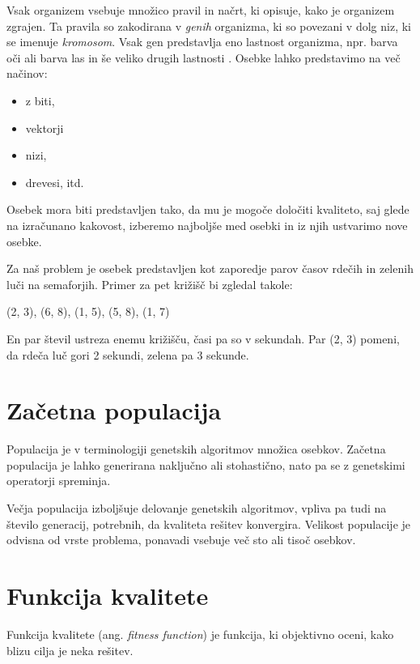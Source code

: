 \documentclass[a4paper, 12pt]{book}
\begin{document}
Vsak organizem vsebuje mno\v zico pravil in na\v crt, ki opisuje, kako je organizem zgrajen. Ta pravila so zakodirana v \textit{genih} organizma, ki so povezani v dolg niz, ki se imenuje \textit{kromosom}. Vsak gen predstavlja eno lastnost organizma, npr. barva o\v ci ali barva las in \v se veliko drugih lastnosti
\cite{aijunkie}. Osebke lahko predstavimo na ve\v c na\v cinov:

\begin{itemize} \itemsep0em
\item z biti,
\item vektorji
\item nizi,
\item drevesi, itd.
\end{itemize}

Osebek mora biti predstavljen tako, da mu je mogo\v ce dolo\v citi kvaliteto, saj glede na izra\v cunano kakovost, izberemo najbolj\v se med osebki in iz njih ustvarimo nove osebke.

Za na\v s problem je osebek predstavljen kot zaporedje parov \v casov rde\v cih in zelenih lu\v ci na semaforjih. Primer za pet kri\v zi\v s\v c bi zgledal takole:
\begin{center}
(2, 3), (6, 8), (1, 5), (5, 8), (1, 7)
\end{center}

En par \v stevil ustreza enemu kri\v zi\v s\v cu, \v casi pa so v sekundah. Par (2, 3) pomeni, da rde\v ca lu\v c gori 2 sekundi, zelena pa 3 sekunde.

\section{Za\v cetna populacija}
Populacija je v terminologiji genetskih algoritmov mno\v zica osebkov. Za\v cetna populacija je lahko generirana naklju\v cno ali stohasti\v cno, nato pa se z genetskimi operatorji spreminja.

Ve\v cja populacija izbolj\v suje delovanje genetskih algoritmov, vpliva pa tudi na \v stevilo generacij, potrebnih, da kvaliteta re\v sitev konvergira. Velikost populacije je odvisna od vrste problema, ponavadi vsebuje ve\v c sto ali tiso\v c osebkov.

\section{Funkcija kvalitete}
Funkcija kvalitete (ang. \textit{fitness function}) je funkcija, ki objektivno oceni, kako blizu cilja je neka re\v sitev.
\end{document}
